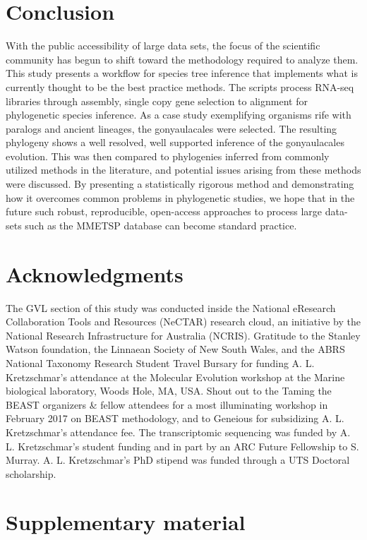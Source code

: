 \documentclass[fleqn,10pt,lineno]{wlpeerj} %
\begin{document}
\section*{Conclusion}
With the public accessibility of large data sets, the focus of the scientific community has begun to shift toward the methodology required to analyze them. 
This study presents a workflow for species tree inference that implements what is currently thought to be the best practice methods. 
The scripts process RNA-seq libraries through assembly, single copy gene selection to alignment for phylogenetic species inference. 
As a case study exemplifying organisms rife with paralogs and ancient lineages, the gonyaulacales were selected. 
The resulting phylogeny shows a well resolved, well supported inference of the gonyaulacales evolution. 
This was then compared to phylogenies inferred from commonly utilized methods in the literature, and potential issues arising from these methods were discussed. 
By presenting a statistically rigorous method and demonstrating how it overcomes common problems in phylogenetic studies, we hope that in the future such robust, reproducible, open-access approaches to process large data-sets such as the MMETSP database can become standard practice.

\section*{Acknowledgments}

The GVL section of this study was conducted inside the National eResearch Collaboration Tools and Resources (NeCTAR) research cloud, an initiative by the National Research Infrastructure for Australia (NCRIS).
Gratitude to the Stanley Watson foundation, the Linnaean Society of New South Wales, and the ABRS National Taxonomy Research Student Travel Bursary for funding A. L. Kretzschmar's attendance at the Molecular Evolution workshop at the Marine biological laboratory, Woods Hole, MA, USA.
Shout out to the Taming the BEAST organizers \& fellow attendees for a most illuminating workshop in February 2017 on BEAST methodology, and to Geneious for subsidizing A. L. Kretzschmar's attendance fee.
The transcriptomic sequencing was funded by A. L. Kretzschmar's student funding and in part by an ARC Future Fellowship to S. Murray.
A. L. Kretzschmar's PhD stipend was funded through a UTS Doctoral scholarship.



\section*{Supplementary material}
\end{document}
